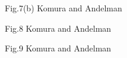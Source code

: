 \newpage
\begin{figure}[tbh]
\epsfxsize=17cm
\centerline{\vbox{}}
\end{figure}
\vskip 4cm
{\LARGE Fig.7(b)  Komura and Andelman}

\newpage
\begin{figure}[tbh]
\epsfxsize=17cm
\centerline{\vbox{}}
\end{figure}
\vskip 4cm
{\LARGE Fig.8  Komura and Andelman}

\newpage
\begin{figure}[tbh]
\epsfxsize=17cm
\centerline{\vbox{}}
\end{figure}
\vskip 4cm
{\LARGE Fig.9  Komura and Andelman}




